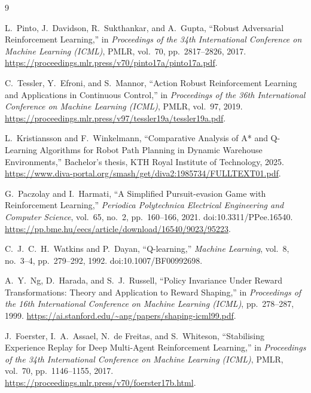 \documentclass[sigconf]{aamas}
\begin{document}
\begin{thebibliography}{9}

L.~Pinto, J.~Davidson, R.~Sukthankar, and A.~Gupta,
``Robust Adversarial Reinforcement Learning,''
in \textit{Proceedings of the 34th International Conference on Machine Learning (ICML)},
PMLR, vol.~70, pp.~2817--2826, 2017.
\url{https://proceedings.mlr.press/v70/pinto17a/pinto17a.pdf}.

C.~Tessler, Y.~Efroni, and S.~Mannor,
``Action Robust Reinforcement Learning and Applications in Continuous Control,''
in \textit{Proceedings of the 36th International Conference on Machine Learning (ICML)},
PMLR, vol.~97, 2019.
\url{https://proceedings.mlr.press/v97/tessler19a/tessler19a.pdf}.

L.~Kristiansson and F.~Winkelmann,
``Comparative Analysis of A* and Q-Learning Algorithms for Robot Path Planning in Dynamic Warehouse Environments,''
Bachelor's thesis, KTH Royal Institute of Technology, 2025.
\url{https://www.diva-portal.org/smash/get/diva2:1985734/FULLTEXT01.pdf}.

G.~Paczolay and I.~Harmati,
``A Simplified Pursuit-evasion Game with Reinforcement Learning,''
\textit{Periodica Polytechnica Electrical Engineering and Computer Science},
vol.~65, no.~2, pp.~160--166, 2021.
doi:10.3311/PPee.16540.
\url{https://pp.bme.hu/eecs/article/download/16540/9023/95223}.

C.~J.~C.~H.~Watkins and P.~Dayan,
``Q-learning,''
\textit{Machine Learning},
vol.~8, no.~3--4, pp.~279--292, 1992.
doi:10.1007/BF00992698.

A.~Y.~Ng, D.~Harada, and S.~J.~Russell,
``Policy Invariance Under Reward Transformations: Theory and Application to Reward Shaping,''
in \textit{Proceedings of the 16th International Conference on Machine Learning (ICML)},
pp.~278--287, 1999.
\url{https://ai.stanford.edu/~ang/papers/shaping-icml99.pdf}.

J.~Foerster, I.~A.~Assael, N.~de Freitas, and S.~Whiteson,
``Stabilising Experience Replay for Deep Multi-Agent Reinforcement Learning,''
in \textit{Proceedings of the 34th International Conference on Machine Learning (ICML)},
PMLR, vol.~70, pp.~1146--1155, 2017.
\url{https://proceedings.mlr.press/v70/foerster17b.html}.

\end{thebibliography}
\end{document}
